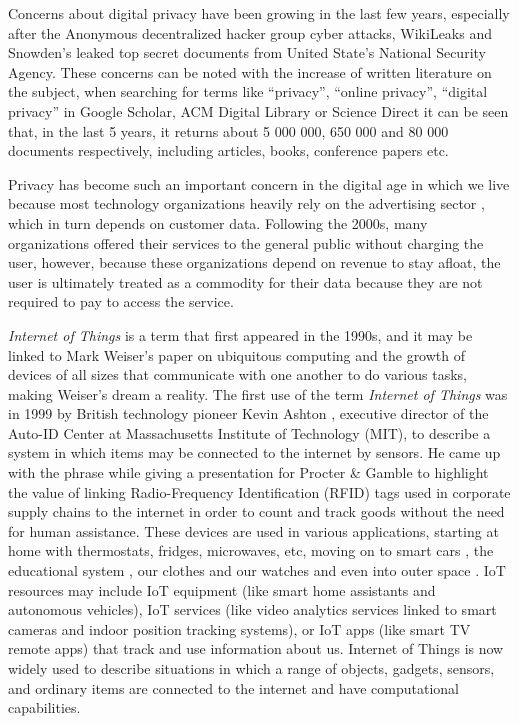 Concerns about digital privacy have been growing \cite{emami2019exploring, park2022personal, zhang2022peer}
in the last few years, especially after the Anonymous decentralized hacker
group cyber attacks, WikiLeaks and Snowden's leaked top secret documents
from United State's National Security Agency. These concerns can be noted
with the increase of written literature on the subject, when searching for
terms like ``privacy'', ``online privacy'', ``digital privacy'' in Google
Scholar, ACM Digital Library or Science Direct it can be seen that, in the
last 5 years, it returns about 5 000 000, 650 000 and 80 000 documents respectively,
including articles, books, conference papers etc.

Privacy has become such an important concern in the digital age in which
we live because most technology organizations heavily rely on
the advertising sector \cite{duan2022pricing}, which in turn depends on customer
data. Following the
2000s, many organizations offered their services to the general public without
charging the user, however, because these organizations depend on revenue to
stay afloat, the user is ultimately treated as a commodity for their data
because they are not required to pay to access the service.

\textit{Internet of Things} is a term that first appeared in the 1990s,
and it may be linked to Mark Weiser's paper on ubiquitous computing \cite{weiser1991computer}
and the growth of devices of all sizes that communicate with one another
to do various tasks, making Weiser's dream a reality. The first use of the
term \textit{Internet of Things} was in 1999 by British technology pioneer
Kevin Ashton \cite{KevinThat}, executive director of the Auto-ID Center
at Massachusetts Institute of Technology (MIT), to describe a system in
which items may be connected to the internet by sensors. He came up with
the phrase while giving a presentation for Procter \& Gamble to highlight
the value of linking Radio-Frequency Identification (RFID) tags used in
corporate supply chains to the internet in order to count and track goods
without the need for human assistance. These devices are used in various
applications, starting at home \cite{marikyan2019systematic} with thermostats,
fridges, microwaves, etc, moving on to smart cars \cite{arena2020overview},
the educational system \cite{al2020survey}, our clothes and our watches \cite{niknejad2020comprehensive}
and even into outer space \cite{AkyildizInternet}. IoT resources may include
IoT equipment (like smart home assistants and autonomous vehicles), IoT
services (like video analytics services linked to smart cameras and indoor
position tracking systems), or IoT apps (like smart TV remote apps) that
track and use information about us. Internet of Things is now widely used
to describe situations in which a range of objects, gadgets, sensors, and
ordinary items are connected to the internet and have computational capabilities.

